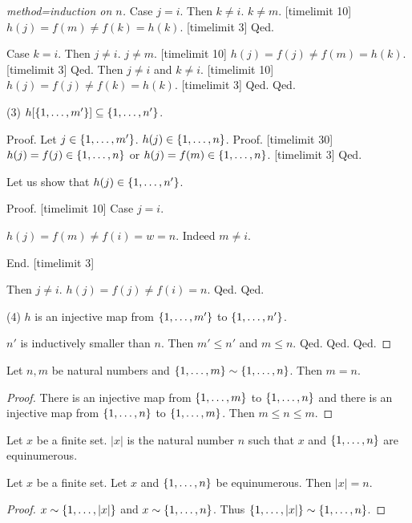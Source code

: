 \documentclass{article}
\begin{document}
\begin{forthel}
\begin{proof}[method=induction on $n$]
  Case $j = i$.
  Then $k \neq i$. $k \neq m$. [timelimit 10]
  $h(j) = f(m) \neq f(k) = h(k)$. [timelimit 3]
  Qed.

  Case $k = i$.
  Then $j \neq i$. $j \neq m$. [timelimit 10]
  $h(j) = f(j) \neq f(m) = h(k)$. [timelimit 3]
  Qed.
  Then $j \neq i$ and $k \neq i$. [timelimit 10]
  $h(j) = f(j) \neq f(k) = h(k)$. [timelimit 3]
  Qed.
  Qed.

(3)  $h[\{1,\dots,m'\}] \subseteq \{1,\dots,n'\}$.

Proof.
  Let $j \in \{1,\dots,m'\}$.
  $h(j) \in \{1,\dots,n\}$.
  Proof.
  [timelimit 30]
  $h(j) = f(j) \in \{1,\dots,n\}$ or $h(j) = f(m) \in \{1,\dots,n\}$.
  [timelimit 3]
  Qed.

  Let us show that  $h(j) \in \{1,\dots,n'\}$.

  Proof.
[timelimit 10]
    Case $j = i$.

    $h(j) = f(m) \neq f(i) = w = n$. Indeed $m \neq i$.

End.
[timelimit 3]

    Then $j \neq i$.
    $h(j) = f(j) \neq f(i) = n$.
  Qed.
  Qed.

(4) $h$ is an injective map from $\{1,\dots,m'\}$ to $\{1,\dots,n'\}$.

  $n'$ is inductively smaller than $n$.
Then $m' \leq n'$ and $m \leq n$.
  Qed.
  Qed.
  Qed.
  \end{proof}


  \begin{lemma}
  Let $n,m$ be natural numbers and
  $\{1,\dots,m\} \sim \{1,\dots,n\}$. Then $m = n$.
  \end{lemma}
  \begin{proof}
  There is an injective map from
  $\{1,\dots,m\}$ to $\{1,\dots,n\}$ and
  there is an injective map from
  $\{1,\dots,n\}$ to $\{1,\dots,m\}$. Then $m \leq n \leq m$.
  \end{proof}

  \begin{signature}
  Let $x$ be a finite set. $|x|$ is the natural number $n$
  such that $x$ and $\{1,\dots,n\}$ are equinumerous.
  \end{signature}

  \begin{lemma} Let $x$ be a finite set.
  Let $x$ and $\{1,\dots,n\}$ be equinumerous. Then
  $|x| = n$.
  \end{lemma}
  \begin{proof}
  $x \sim \{1,\dots,|x|\}$ and $x \sim \{1,\dots,n\}$. Thus $\{1,\dots,|x|\} \sim \{1,\dots,n\}$.
  \end{proof}


\end{forthel}
\end{document}
